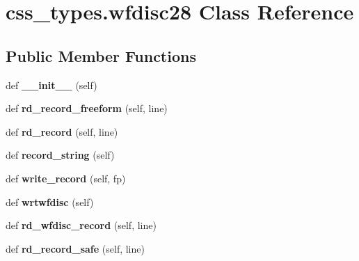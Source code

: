 \hypertarget{classcss__types_1_1wfdisc28}{}\section{css\+\_\+types.\+wfdisc28 Class Reference}
\label{classcss__types_1_1wfdisc28}
\subsection*{Public Member Functions}
\begin{DoxyCompactItemize}
\item 
\hypertarget{classcss__types_1_1wfdisc28_a1a1e9af429e2f790f8cfaf427aab4505}{}def {\bfseries \+\_\+\+\_\+init\+\_\+\+\_\+} (self)\label{classcss__types_1_1wfdisc28_a1a1e9af429e2f790f8cfaf427aab4505}

\item 
\hypertarget{classcss__types_1_1wfdisc28_aa83febb204460ab38bdbcc20074ecb7b}{}def {\bfseries rd\+\_\+record\+\_\+freeform} (self, line)\label{classcss__types_1_1wfdisc28_aa83febb204460ab38bdbcc20074ecb7b}

\item 
\hypertarget{classcss__types_1_1wfdisc28_a4661813a43f9fa868bb26ef8617a9369}{}def {\bfseries rd\+\_\+record} (self, line)\label{classcss__types_1_1wfdisc28_a4661813a43f9fa868bb26ef8617a9369}

\item 
\hypertarget{classcss__types_1_1wfdisc28_a238632d4f3f12ed4279a3a8a88161e4a}{}def {\bfseries record\+\_\+string} (self)\label{classcss__types_1_1wfdisc28_a238632d4f3f12ed4279a3a8a88161e4a}

\item 
\hypertarget{classcss__types_1_1wfdisc28_ae40432c9a6c8eefb9a0902c67e9c47b1}{}def {\bfseries write\+\_\+record} (self, fp)\label{classcss__types_1_1wfdisc28_ae40432c9a6c8eefb9a0902c67e9c47b1}

\item 
\hypertarget{classcss__types_1_1wfdisc28_ab92dd7b52ce1aaf740e68813b680ec0e}{}def {\bfseries wrtwfdisc} (self)\label{classcss__types_1_1wfdisc28_ab92dd7b52ce1aaf740e68813b680ec0e}

\item 
\hypertarget{classcss__types_1_1wfdisc28_a27b9c0498bdeedf35a183d7ed3f85aea}{}def {\bfseries rd\+\_\+wfdisc\+\_\+record} (self, line)\label{classcss__types_1_1wfdisc28_a27b9c0498bdeedf35a183d7ed3f85aea}

\item 
\hypertarget{classcss__types_1_1wfdisc28_a63f1181d7c054b2f6ffda801f9badffb}{}def {\bfseries rd\+\_\+record\+\_\+safe} (self, line)\label{classcss__types_1_1wfdisc28_a63f1181d7c054b2f6ffda801f9badffb}

\end{DoxyCompactItemize}
